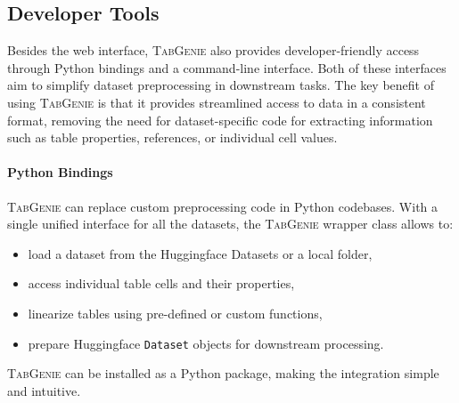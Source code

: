 \subsection{Developer Tools}
\label{sec:tabgenie:developer}
Besides the web interface, \textsc{TabGenie} also provides developer-friendly access through Python bindings and a command-line interface. Both of these interfaces aim to simplify dataset preprocessing in downstream tasks. The key benefit of using \textsc{TabGenie} is that it provides streamlined access to data in a consistent format, removing the need for dataset-specific code for extracting information such as table properties, references, or individual cell values.



\paragraph{Python Bindings} \textsc{TabGenie} can replace custom preprocessing code in Python codebases. With a single unified interface for all the datasets, the \textsc{TabGenie} wrapper class allows to:
\begin{itemize}
    \item load a dataset from the Huggingface Datasets or a local folder,
    \item access individual table cells and their properties,
    \item linearize tables using pre-defined or custom functions,
    \item prepare Huggingface \texttt{Dataset} objects for downstream processing.
\end{itemize}
\textsc{TabGenie} can be installed as a Python package, making the integration simple and intuitive.

